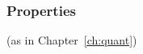 

  

    



  

    
    

    

  
  

  
  
  



\subsubsection{Properties} (as in Chapter~\ref{ch:quant})

